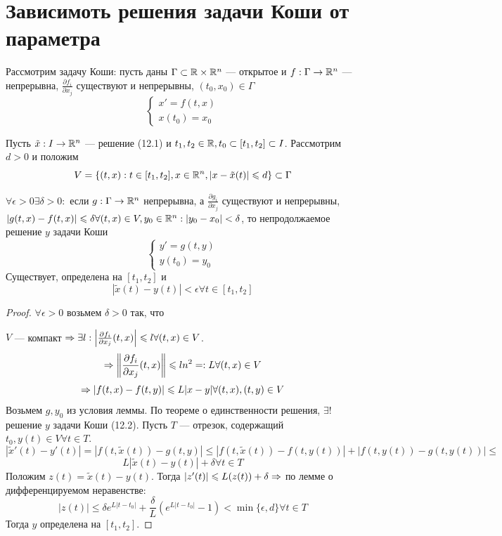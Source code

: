 

\section{Зависимоть решения задачи Коши от параметра}

Рассмотрим задачу Коши: пусть даны \(\Gamma \subset \mathbb{R} \times \mathbb{R}^n\) --- открытое и \(f: \Gamma \rightarrow \mathbb{R}^n\) --- непрерывна, \(\frac{\partial f_i}{\partial x_j}\) существуют и непрерывны, \((t_0, x_0) \in \Gamma\)
\begin{equation}
    \begin{cases}
        x' = f(t, x) \\
        x(t_0) = x_0
    \end{cases}
\end{equation}

Пусть \(\tilde{x}: I \rightarrow \mathbb{R}^n\) --- решение (12.1) и \(t_1, t_2 \in \mathbb{R}, t_0 \subset [t_1, t_2] \subset I\). Рассмотрим \(d > 0\) и положим 
\[V = \{(t, x): t \in [t_1, t_2], x \in \mathbb{R}^n, |x - \tilde{x}(t)| \leqslant d\} \subset \Gamma\]

\begin{lemma}
    \(\forall \epsilon > 0 \exists \delta > 0:\) если \(g: \Gamma \rightarrow \mathbb{R}^n\) непрерывна, а \(\frac{\partial g_i}{\partial x_j}\) существуют и непрерывны, \(|g(t, x) - f(t, x)| \leqslant \delta \forall (t, x) \in V, y_0 \in \mathbb{R}^n: |y_0 - x_0| < \delta\), то непродолжаемое решение \(y\) задачи Коши 
    \begin{equation}
        \begin{cases}
            y' = g(t, y) \\
            y(t_0) = y_0
        \end{cases}
    \end{equation}
    Существует, определена на \([t_1, t_2]\) и
    \[|\tilde{x}(t) - y(t)| < \epsilon \forall t \in [t_1, t_2]\]
\end{lemma}
\begin{proof}
    \(\forall \epsilon > 0\) возьмем \(\delta > 0\) так, что

    \(V\) --- компакт \(\Rightarrow \exists l: \left|\frac{\partial f_i}{\partial x_j}(t, x)\right| \leqslant l \forall (t, x) \in V\).
    \[\Rightarrow \left\|\frac{\partial f_i}{\partial x_j}(t, x)\right\| \leqslant ln^2 =: L \forall (t, x) \in V\]
    \[\Rightarrow |f(t, x) - f(t, y)| \leqslant L|x - y| \forall (t, x), (t, y) \in V\]
    Возьмем \(g, y_0\) из условия леммы. По теореме о единственности решения, \(\exists !\) решение \(y\) задачи Коши (12.2). Пусть \(T\) --- отрезок, содержащий \(t_0, y(t) \in V \forall t \in T\).
    \[|\tilde{x}'(t) - y'(t)| = |f(t, \tilde{x}(t)) - g(t, y)| \le |f(t, \tilde{x}(t)) - f(t, y(t))| + |f(t, y(t)) - g(t, y(t))| \le\]
    \[L|\tilde{x}(t) - y(t)| + \delta \forall t \in T\]
    Положим \(z(t) = \tilde{x}(t) - y(t)\). Тогда \(|z'(t)| \leqslant L(z(t)) + \delta \Rightarrow\) по лемме о дифференцируемом неравенстве:
    \[|z(t)| \le \delta e^{L|t - t_0|} + \frac{\delta}{L}\left( e^{L|t - t_0|} - 1\right) < \min\{\epsilon, d\} \forall t \in T\]
    Тогда \(y\) определена на \([t_1, t_2]\).
\end{proof}

